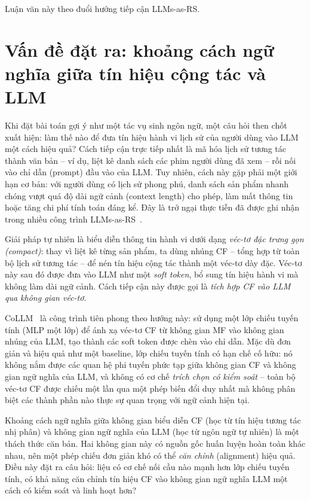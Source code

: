 Luận văn này theo đuổi hướng tiếp cận LLMs-as-RS.

\section{Vấn đề đặt ra: khoảng cách ngữ nghĩa giữa tín hiệu cộng tác và LLM}
\label{sec:van-de}

Khi đặt bài toán gợi ý như một tác vụ sinh ngôn ngữ, một câu hỏi then chốt xuất hiện:
làm thế nào để đưa tín hiệu hành vi lịch sử của người dùng vào LLM một cách hiệu quả?
Cách tiếp cận trực tiếp nhất là mã hóa lịch sử tương tác thành văn bản -- ví dụ, liệt
kê danh sách các phim người dùng đã xem -- rồi nối vào chỉ dẫn (prompt) đầu vào của LLM.
Tuy nhiên, cách này gặp phải một giới hạn cơ bản: với người dùng có lịch sử phong phú,
danh sách sản phẩm nhanh chóng vượt quá độ dài ngữ cảnh (context length) cho phép, làm
mất thông tin hoặc tăng chi phí tính toán đáng kể. Đây là trở ngại thực tiễn đã được ghi
nhận trong nhiều công trình LLMs-as-RS~\cite{collm2023}.

Giải pháp tự nhiên là biểu diễn thông tin hành vi dưới dạng \textit{véc-tơ đặc trưng
gọn (compact)}: thay vì liệt kê từng sản phẩm, ta dùng nhúng CF -- tổng hợp từ toàn bộ lịch
sử tương tác -- để nén tín hiệu cộng tác thành một véc-tơ dày đặc. Véc-tơ này sau đó
được đưa vào LLM như một \textit{soft token}, bổ sung tín hiệu hành vi mà không làm dài
ngữ cảnh. Cách tiếp cận này được gọi là \textit{tích hợp CF vào LLM qua không gian véc-tơ}.

CoLLM~\cite{collm2023} là công trình tiên phong theo hướng này: sử dụng một lớp chiếu
tuyến tính (MLP một lớp) để ánh xạ véc-tơ CF từ không gian MF vào không gian nhúng của
LLM, tạo thành các soft token được chèn vào chỉ dẫn. Mặc dù đơn giản và hiệu quả như
một baseline, lớp chiếu tuyến tính có hạn chế cố hữu: nó không nắm được các quan hệ
phi tuyến phức tạp giữa không gian CF và không gian ngữ nghĩa của LLM, và không có cơ
chế \textit{trích chọn có kiểm soát} -- toàn bộ véc-tơ CF được chiếu một lần qua một
phép biến đổi duy nhất mà không phân biệt các thành phần nào thực sự quan trọng với ngữ
cảnh hiện tại.

Khoảng cách ngữ nghĩa giữa không gian biểu diễn CF (học từ tín hiệu tương tác nhị phân)
và không gian ngữ nghĩa của LLM (học từ ngôn ngữ tự nhiên) là một thách thức căn bản.
Hai không gian này có nguồn gốc huấn luyện hoàn toàn khác nhau, nên một phép chiếu đơn
giản khó có thể \textit{căn chỉnh} (alignment) hiệu quả. Điều này đặt ra
câu hỏi: liệu có cơ chế nối cầu nào mạnh hơn lớp chiếu tuyến tính, có khả năng căn chỉnh
tín hiệu CF vào không gian ngữ nghĩa LLM một cách có kiểm soát và linh hoạt hơn?

